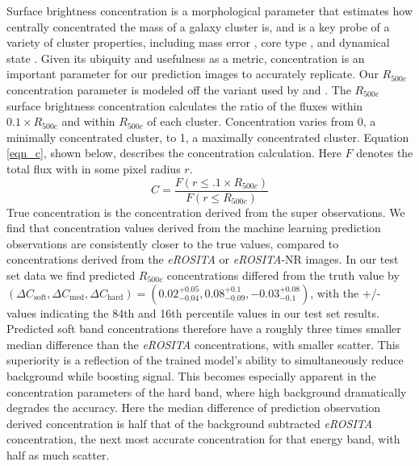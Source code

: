 \documentclass[twocolumn, 11pt]{aastex63}%
\begin{document}
Surface brightness concentration is a morphological parameter that estimates how centrally concentrated the mass of a galaxy cluster is, and is a key probe of a variety of cluster properties, including mass error \citep{Green_2019}, core type \citep{Santos_2008}, and dynamical state \citep{Rasia_2013, Parekh_2015, Lovisari_2017}. Given its ubiquity and usefulness as a metric, concentration is an important parameter for our prediction images to accurately replicate. Our $R_{500c}$ concentration parameter is modeled off the variant used by \citet{Lovisari_2017} and \citet{Green_2019}. The $R_{500c}$ surface brightness concentration calculates the ratio of the fluxes within $0.1 \times R_{500c}$ and within $R_{500c}$ of each cluster. Concentration varies from 0, a minimally concentrated cluster, to 1, a maximally concentrated cluster. Equation \ref{eqn_c}, shown below, describes the concentration calculation. Here $F$ denotes the total flux with in some pixel radius $r$.
\begin{equation}\label{eqn_c}
    C = \frac{F(r \leq .1 \times R_{500c})}{F( r \leq R_{500c})}
\end{equation}
True concentration is the concentration derived from the super observations.  We find that concentration values derived from the machine learning prediction observations are consistently closer to the true values, compared to concentrations derived from the \textit{eROSITA} or \textit{eROSITA}-NR images. In our test set data we find predicted $R_{500c}$ concentrations differed from the truth value by $(\Delta C_{\mathrm{soft}},\Delta C_{\mathrm{med}},\Delta C_{\mathrm{hard}}) = (0.02_{-0.04}^{+0.05}, 0.08_{-0.09}^{+0.1}, -0.03_{-0.1}^{+0.08})$, with the +/- values indicating the 84th and 16th percentile values in our test set results. Predicted soft band concentrations therefore have a roughly three times smaller median difference than the \textit{eROSITA} concentrations, with smaller scatter. This superiority is a reflection of the trained model's ability to simultaneously reduce background while boosting signal. This becomes especially apparent in the concentration parameters of the hard band, where high background dramatically degrades the accuracy. Here the median difference of prediction observation derived concentration is half that of the background subtracted \textit{eROSITA} concentration, the next most accurate concentration for that energy band, with half as much scatter. 
\end{document}
